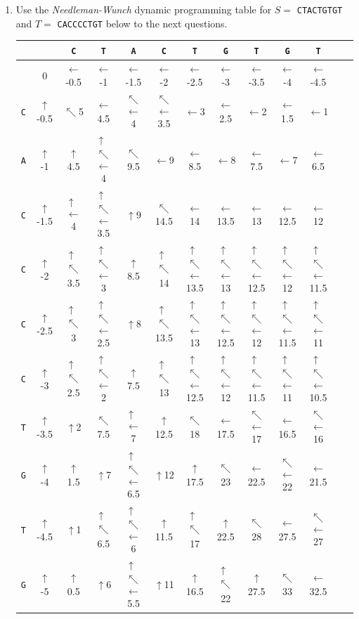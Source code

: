 \documentclass[11pt, oneside]{article}   	%
\newcommand{\diru}{$\uparrow$}
\newcommand{\dirl}{$\leftarrow$}
\newcommand{\dird}{$\nwarrow$}
\newcommand{\dirdl}{$\substack{\nwarrow\\\leftarrow}$}
\newcommand{\dirdu}{$\substack{\uparrow\\\nwarrow}$}
\newcommand{\dirlu}{$\substack{\uparrow\\\leftarrow}$}
\newcommand{\dirdlu}{$\substack{\uparrow\\\nwarrow\\\leftarrow}$}
\begin{document}
\clearpage
\begin{enumerate}
\item Use the \textit{Needleman-Wunch} dynamic programming table for $S = $ \texttt{CTACTGTGT} and $T = $ \texttt{CACCCCTGT} below to the next questions.
%
\renewcommand{\arraystretch}{2}
\begin{center}
{\footnotesize
\begin{tabular}{|c||c|c|c|c|c|c|c|c|c|c|c|c|}
\hline
& & \texttt{C} &  \texttt{T} &  \texttt{A} &  \texttt{C} &  \texttt{T} &  \texttt{G} &  \texttt{T} &  \texttt{G} &  \texttt{T}\\
\hline
\hline
&  0 &	  \dirl -0.5 &	 \dirl  -1 &	\dirl -1.5 &	\dirl -2 &	\dirl -2.5 &	\dirl -3 &	\dirl -3.5 &	\dirl -4 &	\dirl -4.5 \\[1ex]
\hline
\texttt{C} &  \diru -0.5 &	 \dird 5  &	 \dirl 4.5 &	\dirdl 4 &	\dirdl 3.5 &	\dirl 3 &		\dirl 2.5 &	\dirl 2 &		\dirl 1.5 &	\dirl 1 \\[1ex]
\hline 
\texttt{A} &  \diru -1 & 	\diru 4.5 & 	 \dirdlu 4 &    \dird 9.5 & \dirl 9 &		\dirl 8.5 &	\dirl 8 &		\dirl 7.5 &	\dirl 7 &		\dirl 6.5\\[1ex]
\hline
\texttt{C} &  \diru -1.5 & 	\dirlu 4 & \dirdlu 3.5 & \diru 9 &  \dird 14.5 & \dirl 14 & \dirl 13.5 & \dirl 13 & \dirl 12.5 & \dirl 12 \\[1ex]
\hline 
\texttt{C} &  \diru -2 & \dirdu 3.5 & \dirdlu 3 & \diru 8.5 &   \dirdu 14 & \dirdlu 13.5 & \dirdlu 13 & \dirdlu 12.5 & \dirdlu 12 & \dirdlu 11.5 \\[1ex]
\hline 
\texttt{C} &  \diru -2.5 & \dirdu 3 & \dirdlu 2.5 & \diru 8 &   \dirdu 13.5 & \dirdlu 13 & \dirdlu 12.5 & \dirdlu 12 & \dirdlu 11.5 & \dirdlu 11 \\[1ex]
\hline 
\texttt{C} &  \diru -3 & \dirdu 2.5 & \dirdlu 2 & \diru 7.5 &   \dirdu 13 & \dirdlu 12.5 & \dirdlu 12 & \dirdlu 11.5 & \dirdlu 11 & \dirdlu 10.5 \\[1ex]
\hline  
\texttt{T} &  \diru -3.5 & \diru 2 & \dird 7.5 & \dirlu 7 & \diru 12.5 &   \dird 18 & \dirl 17.5 & \dirdl 17 & \dirl 16.5 & \dirdl 16  \\[1ex]
\hline 
\texttt{G} &  \diru -4 & \diru 1.5 & \diru 7 & \dirdlu 6.5 & \diru 12 & \diru 17.5 &   \dird 23 & \dirl 22.5 & \dirdl 22 & \dirl 21.5 \\[1ex]
\hline 
\texttt{T} &  \diru -4.5 & \diru 1 & \dirdu 6.5 & \dirdlu 6 & \diru 11.5 & \dirdu 17 & \diru 22.5 &   \dird 28 & \dirl 27.5 & \dirdl 27 \\[1ex]
\hline 
\texttt{G} &  \diru -5 & \diru 0.5 & \diru 6 & \dirdlu 5.5 & \diru 11 & \diru 16.5 & \dirdu 22 & \diru 27.5 &  \dird 33 &  \dirl 32.5 \\[1ex]

\end{tabular}}
\end{center}
\end{enumerate}
\end{document}
